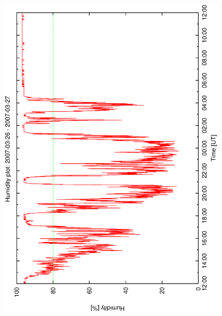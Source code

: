 \begin{figure}[htbp]
\begin{center}
{    \includegraphics[scale=0.25, angle=-90]{figures/ecs/hum_1_2007_03_26.eps}  
    \label{fig:hum_profile_2007_03_26}
  }
\end{center}
\end{figure}
